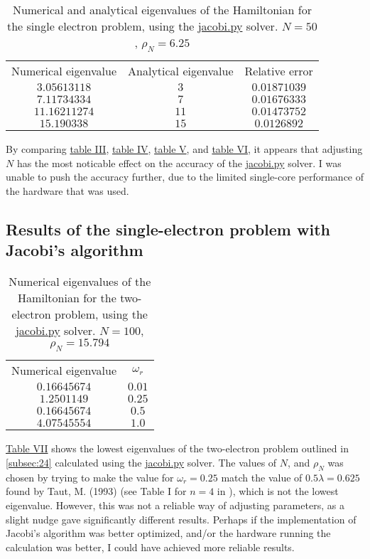 \documentclass[english,notitlepage,reprint]{revtex4-1}  %
\begin{document}
\begin{table}[H]
	\label{tab:434}
	\centering
	\begin{tabular}{|c|c|c|}
	Numerical eigenvalue & Analytical eigenvalue & Relative error \\
	\(3.05613118\)	& \(3\) & \(0.01871039\) \\
	\(7.11734334\) & \(7\) & \(0.01676333\) \\
	\(11.16211274\) & \(11\) & \(0.01473752\) \\
	\(15.190338\) & \(15\) & \(0.0126892\) \\
	\end{tabular}
	\caption{Numerical and analytical eigenvalues of the Hamiltonian for
	the single electron problem, using the \hyperref[A:2]{jacobi.py} solver. \(N=50\),
	\(\rho_{N}=6.25\)}
\end{table}
By comparing \hyperref[tab:431]{table III}, \hyperref[tab:432]{table IV}, \hyperref[tab:433]{table V}, and \hyperref[tab:434]{table VI}, it appears that adjusting \(N\) has the most noticable effect on the accuracy of the \hyperref[A:2]{jacobi.py} solver. I was unable to push the accuracy further, due to the limited single-core performance of the hardware that was used.

\subsection{Results of the single-electron problem with Jacobi's algorithm}\label{subsec:44}
\begin{table}[H]
	\label{tab:441}
	\centering
	\begin{tabular}{|c|c|}
	Numerical eigenvalue & \(\omega_{r}\) \\
	\(0.16645674\)	& \(0.01\) \\
	\(1.2501149\) & \(0.25\) \\
	\(0.16645674\) & \(0.5\) \\
	\(4.07545554\) & \(1.0\) \\
	\end{tabular}
	\caption{Numerical eigenvalues of the Hamiltonian for
	the two-electron problem, using the \hyperref[A:2]{jacobi.py} solver. \(N=100\),
	\(\rho_{N}=15.794\)}
\end{table}
\hyperref[tab:441]{Table VII} shows the lowest eigenvalues of the two-electron problem outlined in \autoref{subsec:24} calculated using the \hyperref[A:2]{jacobi.py} solver. The values of \(N\), and \(\rho_{N}\) was chosen by trying to make the value for \(\omega_{r}=0.25\) match the value of \(0.5\lambda=0.625\) found by Taut, M. (1993) (see Table I for \(n=4\) in \citep{PhysRevA.48.3561}), which is not the lowest eigenvalue. However, this was not a reliable way of adjusting parameters, as a slight nudge gave significantly different results. Perhaps if the implementation of Jacobi's algorithm was better optimized, and/or the hardware running the calculation was better, I could have achieved more reliable results.
\end{document}
